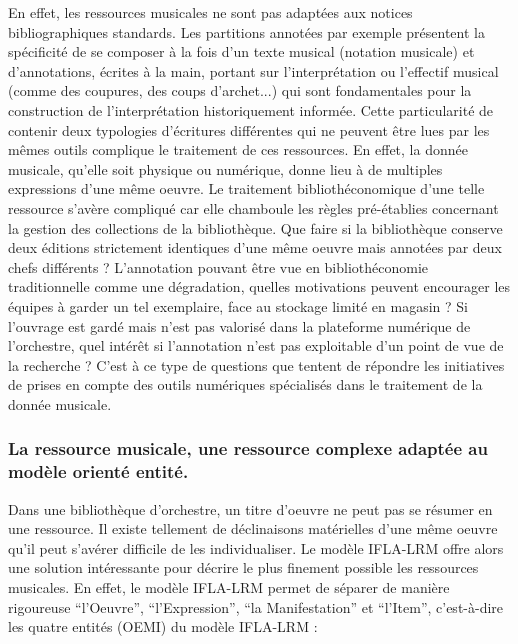 En effet, les ressources musicales ne sont pas adaptées aux notices bibliographiques standards. Les partitions annotées par exemple présentent la spécificité de se composer à la fois d'un texte musical (notation musicale) et d'annotations, écrites à la main, portant sur l'interprétation ou l'effectif musical (comme des coupures, des coups d'archet...) qui sont fondamentales pour la construction de l'interprétation historiquement informée. Cette particularité de contenir deux typologies d'écritures différentes qui ne peuvent être lues par les mêmes outils complique le traitement de ces ressources. 
En effet, la donnée musicale, qu'elle soit physique ou numérique, donne lieu à de multiples expressions d'une même oeuvre. Le traitement bibliothéconomique d'une telle ressource s'avère compliqué car elle chamboule les règles pré-établies concernant la gestion des collections de la bibliothèque. Que faire si la bibliothèque conserve deux éditions strictement identiques d'une même oeuvre mais annotées par deux chefs différents ? L'annotation pouvant être vue en bibliothéconomie traditionnelle comme une dégradation, quelles motivations peuvent encourager les équipes à garder un tel exemplaire, face au stockage limité en magasin ? Si l'ouvrage est gardé mais n'est pas valorisé dans la plateforme numérique de l'orchestre, quel intérêt si l'annotation n'est pas exploitable d'un point de vue de la recherche ? C'est à ce type de questions que tentent de répondre les initiatives de prises en compte des outils numériques spécialisés dans le traitement de la donnée musicale. 

\subsubsection*{La ressource musicale, une ressource complexe adaptée au modèle orienté entité.}

Dans une bibliothèque d'orchestre, un titre d'oeuvre ne peut pas se résumer en une ressource. Il existe tellement de déclinaisons matérielles d'une même oeuvre qu'il peut s'avérer difficile de les individualiser. Le modèle IFLA-LRM offre alors une solution intéressante pour décrire le plus finement possible les ressources musicales. En effet, le modèle IFLA-LRM permet de séparer de manière rigoureuse \enquote{l'Oeuvre}, \enquote{l'Expression}, \enquote{la Manifestation} et \enquote{l'Item}, c'est-à-dire les quatre entités (OEMI) du modèle IFLA-LRM : 

